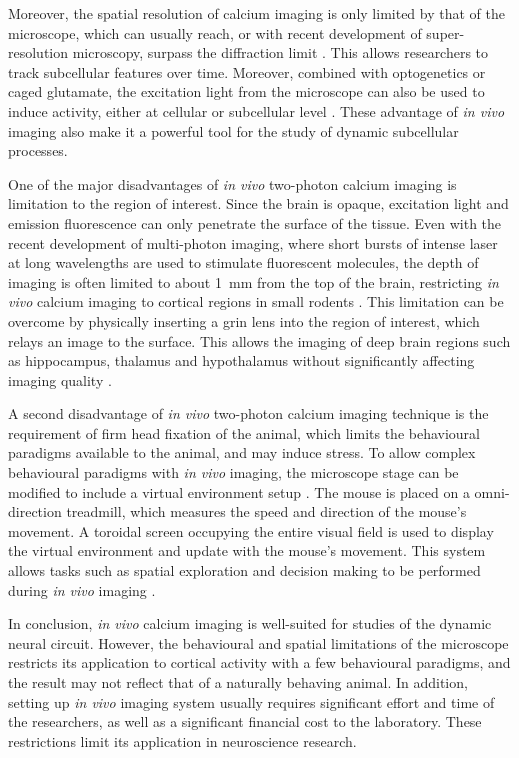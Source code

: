 Moreover, the spatial resolution of calcium imaging is only limited by that of the microscope, which can usually reach, or with recent development of super-resolution microscopy, surpass the diffraction limit \citep{dudok15}. This allows researchers to track subcellular features over time. Moreover, combined with optogenetics or caged glutamate, the excitation light from the microscope can also be used to induce activity, either at cellular or subcellular level \citep{kantevari10, noguchi11, prakash12}. These advantage of \textit{in vivo} imaging also make it a powerful tool for the study of dynamic subcellular processes. 

One of the major disadvantages of \textit{in vivo} two-photon calcium imaging is limitation to the region of interest. Since the brain is opaque, excitation light and emission fluorescence can only penetrate the surface of the tissue. Even with the recent development of multi-photon imaging, where short bursts of intense laser at long wavelengths are used to stimulate fluorescent molecules, the depth of imaging is often limited to about \SI{1}{\mm} from the top of the brain, restricting \textit{in vivo} calcium imaging to cortical regions in small rodents \citep{horton13, yang17}. This limitation can be overcome by physically inserting a \gls{grin} lens into the region of interest, which relays an image to the surface. This allows the imaging of deep brain regions such as hippocampus, thalamus and hypothalamus without significantly affecting imaging quality \citep{attardo15}.

A second disadvantage of \textit{in vivo} two-photon calcium imaging technique is the requirement of firm head fixation of the animal, which limits the behavioural paradigms available to the animal, and may induce stress. To allow complex behavioural paradigms with \textit{in vivo} imaging, the microscope stage can be modified to include a virtual environment setup \citep{harvey09}. The mouse is placed on a omni-direction treadmill, which measures the speed and direction of the mouse's movement. A toroidal screen occupying the entire visual field is used to display the virtual environment and update with the mouse's movement. This system allows tasks such as spatial exploration and decision making to be performed during \textit{in vivo} imaging \citep{harvey09, harvey12}. 

In conclusion, \textit{in vivo} calcium imaging is well-suited for studies of the dynamic neural circuit. However, the behavioural and spatial limitations of the microscope restricts its application to cortical activity with a few behavioural paradigms, and the result may not reflect that of a naturally behaving animal. In addition, setting up \textit{in vivo} imaging system usually requires significant effort and time of the researchers, as well as a significant financial cost to the laboratory. These restrictions limit its application in neuroscience research. 


